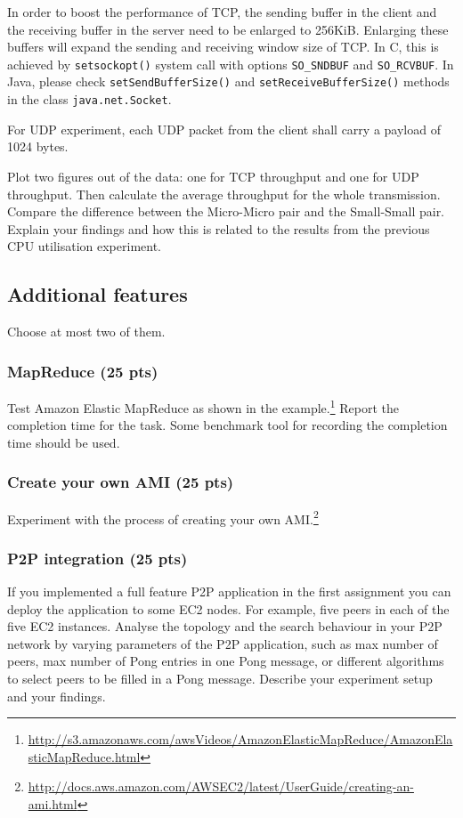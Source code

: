 \documentclass[12pt, a4paper]{article}
\begin{document}
In order to boost the performance of TCP, the sending buffer in the client and the receiving buffer in the server need to be enlarged to 256KiB.
Enlarging these buffers will expand the sending and receiving window size of TCP.
In C, this is achieved by \texttt{setsockopt()} system call with options \texttt{SO\_SNDBUF} and \texttt{SO\_RCVBUF}.
In Java, please check \texttt{setSendBufferSize()} and \texttt{setReceiveBufferSize()} methods in the class \texttt{java.net.Socket}.

For UDP experiment, each UDP packet from the client shall carry a payload of 1024 bytes.

Plot two figures out of the data: one for TCP throughput and one for UDP throughput.
Then calculate the average throughput for the whole transmission.
Compare the difference between the Micro-Micro pair and the Small-Small pair.
Explain your findings and how this is related to the results from the previous CPU utilisation experiment.


\subsection{Additional features}
Choose at most two of them.

\subsubsection{MapReduce (25 pts)}
Test Amazon Elastic MapReduce as shown in the example.\footnote{\url{http://s3.amazonaws.com/awsVideos/AmazonElasticMapReduce/AmazonElasticMapReduce.html}}
Report the completion time for the task.
Some benchmark tool for recording the completion time should be used.

\subsubsection{Create your own AMI (25 pts)}
Experiment with the process of creating your own AMI.\footnote{\url{http://docs.aws.amazon.com/AWSEC2/latest/UserGuide/creating-an-ami.html}}

\subsubsection{P2P integration (25 pts)}
If you implemented a full feature P2P application in the first assignment you can deploy the application to some EC2 nodes.
For example, five peers in each of the five EC2 instances.
Analyse the topology and the search behaviour in your P2P network by varying parameters of the P2P application, such as max number of peers, max number of Pong entries in one Pong message, or different algorithms to select peers to be filled in a Pong message.
Describe your experiment setup and your findings.
\end{document}
